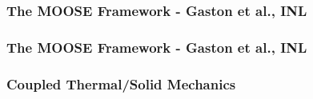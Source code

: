 \frame
{
  \frametitle{The MOOSE Framework - Gaston et al., INL}
  \begin{center}
  \end{center}
}






\frame
{
  \frametitle{The MOOSE Framework - Gaston et al., INL}
  \begin{center}
  \end{center}
}

\frame
{
  \frametitle{Coupled Thermal/Solid Mechanics}
  \begin{center}



  \end{center}
}
